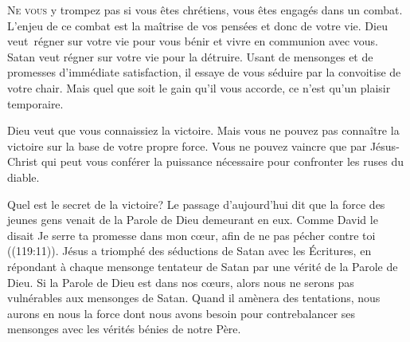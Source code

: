 




\lettrine{N}{e vous} y trompez pas\frcolon{} si vous êtes chrétiens,
 vous êtes engagés dans un combat. L'enjeu de ce combat est la maîtrise
 de vos pensées et donc de votre vie.
 Dieu veut~régner sur votre vie
 pour vous bénir et vivre en communion avec vous.
 Satan veut régner sur votre vie pour la détruire.
 Usant de mensonges et de promesses d'immédiate satisfaction,
 il essaye de vous séduire par la convoitise de votre chair.
 Mais quel que soit le gain qu'il vous accorde,
 ce n'est qu'un plaisir temporaire.


Dieu veut que vous connaissiez la victoire. Mais vous ne pouvez pas connaître
 la victoire sur la base de votre propre force. Vous ne pouvez vaincre
 que par Jésus-Christ qui peut vous conférer la puissance nécessaire pour
 confronter les ruses du diable.

Quel est le secret de la victoire? Le passage d'aujourd'hui dit que la force
 des jeunes gens venait de la Parole de Dieu demeurant en eux.
 Comme David le disait\frcolon{} 
 \Og Je serre ta promesse dans mon c\oe{}ur, afin de ne pas pécher contre toi \Fg{}
 ((119:11)).
 Jésus a triomphé des séductions de Satan avec les Écritures, en répondant
 à chaque mensonge tentateur de Satan par une vérité de la Parole de Dieu.
 Si la Parole de Dieu est dans nos c\oe{}urs, alors nous ne serons pas
 vulnérables aux mensonges de Satan.
 Quand il amènera des tentations, nous aurons en nous la force dont nous
 avons besoin pour contrebalancer ses mensonges avec les vérités bénies 
 de notre Père.


\dvrule






